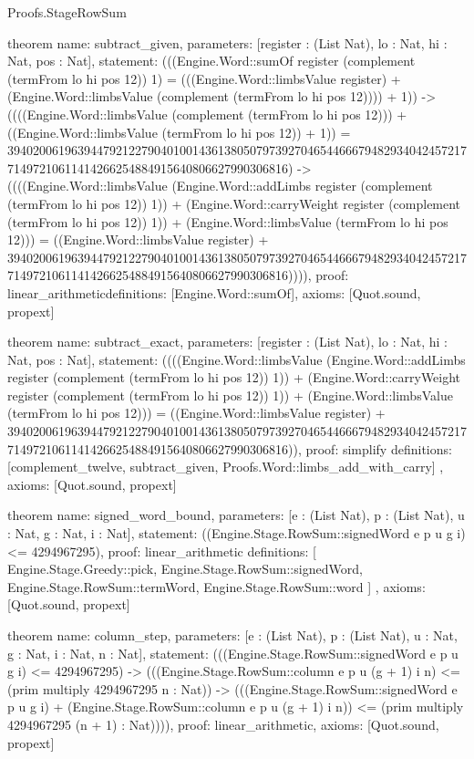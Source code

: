 \begin{lexlean}{Proofs.StageRowSum}
\begin{semanticmodule}
theorem{
  name: subtract_given,
  parameters: [register : (List Nat), lo : Nat, hi : Nat, pos : Nat],
  statement: (((Engine.Word::sumOf register (complement (termFrom lo hi pos 12)) 1) = (((Engine.Word::limbsValue register) + (Engine.Word::limbsValue (complement (termFrom lo hi pos 12)))) + 1)) -> ((((Engine.Word::limbsValue (complement (termFrom lo hi pos 12))) + ((Engine.Word::limbsValue (termFrom lo hi pos 12)) + 1)) = 39402006196394479212279040100143613805079739270465446667948293404245721771497210611414266254884915640806627990306816) -> ((((Engine.Word::limbsValue (Engine.Word::addLimbs register (complement (termFrom lo hi pos 12)) 1)) + (Engine.Word::carryWeight register (complement (termFrom lo hi pos 12)) 1)) + (Engine.Word::limbsValue (termFrom lo hi pos 12))) = ((Engine.Word::limbsValue register) + 39402006196394479212279040100143613805079739270465446667948293404245721771497210611414266254884915640806627990306816)))),
  proof: linear_arithmetic{definitions: [Engine.Word::sumOf]},
  axioms: [Quot.sound, propext]
}

theorem{
  name: subtract_exact,
  parameters: [register : (List Nat), lo : Nat, hi : Nat, pos : Nat],
  statement: ((((Engine.Word::limbsValue (Engine.Word::addLimbs register (complement (termFrom lo hi pos 12)) 1)) + (Engine.Word::carryWeight register (complement (termFrom lo hi pos 12)) 1)) + (Engine.Word::limbsValue (termFrom lo hi pos 12))) = ((Engine.Word::limbsValue register) + 39402006196394479212279040100143613805079739270465446667948293404245721771497210611414266254884915640806627990306816)),
  proof: simplify{
    definitions: [complement_twelve, subtract_given, Proofs.Word::limbs_add_with_carry]
  },
  axioms: [Quot.sound, propext]
}

theorem{
  name: signed_word_bound,
  parameters: [e : (List Nat), p : (List Nat), u : Nat, g : Nat, i : Nat],
  statement: ((Engine.Stage.RowSum::signedWord e p u g i) <= 4294967295),
  proof: linear_arithmetic{
    definitions: [
      Engine.Stage.Greedy::pick,
      Engine.Stage.RowSum::signedWord,
      Engine.Stage.RowSum::termWord,
      Engine.Stage.RowSum::word
    ]
  },
  axioms: [Quot.sound, propext]
}

theorem{
  name: column_step,
  parameters: [e : (List Nat), p : (List Nat), u : Nat, g : Nat, i : Nat, n : Nat],
  statement: (((Engine.Stage.RowSum::signedWord e p u g i) <= 4294967295) -> (((Engine.Stage.RowSum::column e p u (g + 1) i n) <= (prim multiply 4294967295 n : Nat)) -> (((Engine.Stage.RowSum::signedWord e p u g i) + (Engine.Stage.RowSum::column e p u (g + 1) i n)) <= (prim multiply 4294967295 (n + 1) : Nat)))),
  proof: linear_arithmetic{},
  axioms: [Quot.sound, propext]
}


\end{semanticmodule}
\end{lexlean}
